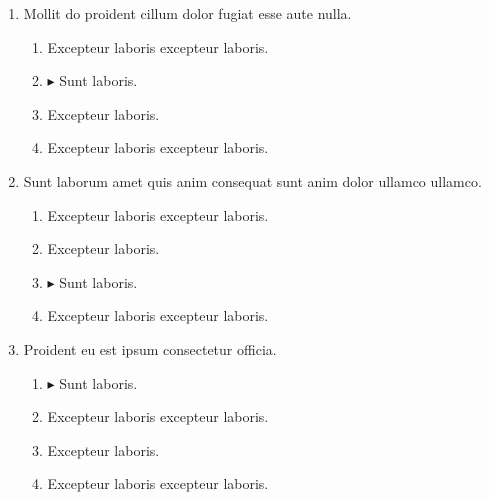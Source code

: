 \documentclass[a4paper,12pt]{article}
\begin{document}
\begin{enumerate}[label=\textbf{\arabic*.}]
\item Mollit do proident cillum dolor fugiat esse aute nulla.
\begin{multicols}{2}
	\begin{enumerate}
		\item  Excepteur laboris excepteur laboris.
  
		\item $\blacktriangleright$  Sunt laboris.
    
		\item  Excepteur laboris.
    
		\item  Excepteur laboris excepteur laboris.
    
	\end{enumerate}

\end{multicols}
\item Sunt laborum amet quis anim consequat sunt anim dolor ullamco ullamco.
\begin{multicols}{2}
	\begin{enumerate}
		\item  Excepteur laboris excepteur laboris.
  
		\item  Excepteur laboris.
    
		\item $\blacktriangleright$  Sunt laboris.
    
		\item  Excepteur laboris excepteur laboris.
    
	\end{enumerate}

\end{multicols}
\item Proident eu est ipsum consectetur officia.
\begin{multicols}{2}
	\begin{enumerate}
		\item $\blacktriangleright$  Sunt laboris.
    
		\item  Excepteur laboris excepteur laboris.
    
		\item  Excepteur laboris.
    
		\item  Excepteur laboris excepteur laboris.
  
	\end{enumerate}


\end{multicols}
\end{enumerate}
\end{document}
